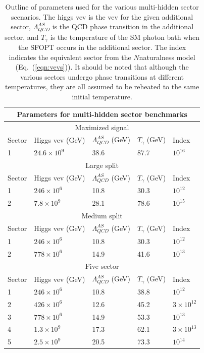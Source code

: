 \documentclass[nofootinbib,twocolumn,preprintnumbers]{revtex4-1}
\begin{document}
\begin{table}[t]
\begin{center}
\begin{tabular}{ |p{2cm}||p{3cm}|p{3cm}|p{3cm}|p{2cm}|  }
 \hline
 \multicolumn{5}{|c|}{Parameters for multi-hidden sector benchmarks} \\
 \hline
\multicolumn{5}{|c|}{Maximized signal} \\
 \hline
 Sector & Higgs vev (GeV) & $\Lambda^{AS}_{QCD}$ (GeV) & $T_\gamma$ (GeV) & Index\\
 \hline
 1 & $24.6 \times 10^{9}$ & 38.6 & 87.7 & $10^{16}$ \\
 \hline
\multicolumn{5}{|c|}{Large split} \\
 \hline
 Sector & Higgs vev (GeV) & $\Lambda^{AS}_{QCD}$ (GeV) & $T_\gamma$ (GeV) & Index\\
 \hline
 1 & $246 \times 10^6$  & 10.8 & 30.3 & $10^{12}$ \\
 2 & $7.8 \times 10^9$  & 28.1 & 78.6 & $10^{15}$ \\
 \hline
 \multicolumn{5}{|c|}{Medium split} \\
 \hline
 Sector & Higgs vev (GeV) & $\Lambda^{AS}_{QCD}$ (GeV) & $T_\gamma$ (GeV) & Index\\
 \hline
 1 & $246 \times 10^{6}$ & 10.8 & 30.3 & $10^{12}$ \\
 2 & $778 \times 10^6$  & 14.9 & 41.6 & $10^{13}$ \\
 \hline
 \multicolumn{5}{|c|}{Five sector} \\
 \hline
 Sector & Higgs vev (GeV) & $\Lambda^{AS}_{QCD}$ (GeV) & $T_\gamma$ (GeV) & Index\\
 \hline
 1 & $246 \times 10^6$ & 10.8 & 38.8 & $10^{12}$ \\
 2 & $426 \times 10^6$ & 12.6 & 45.2 & $3\times10^{12}$ \\
 3 & $778 \times 10^6$ & 14.9 & 53.3 & $10^{13}$ \\
 4 & $1.3 \times 10^9$ & 17.3 & 62.1 & $3\times10^{13}$ \\
 5 & $2.5 \times 10^9$ & 20.5 & 73.3 & $10^{14}$ \\
 \hline
\end{tabular}
\caption{Outline of parameters used for the various multi-hidden sector scenarios. The higgs vev is the vev for the given additional sector, $\Lambda^{AS}_{QCD}$ is the QCD phase transition in the additional sector, and $T_\gamma$ is the temperature of the SM photon bath when the SFOPT occurs in the additional sector. The index indicates the equivalent sector from the $N$naturalness model (Eq.~(\ref{eqn:vevs})). It should be noted that although the various sectors undergo phase transitions at different temperatures, they are all assumed to be reheated to the same initial temperature.}\label{tab:cases}
\end{center}
\end{table}
\end{document}
